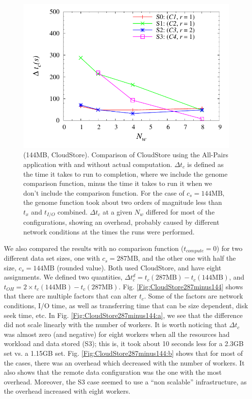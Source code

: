 \documentclass{rspublic}
\begin{document}
\begin{figure}
\begin{center}
\includegraphics[scale=0.5]{data/graphs/CloudStoreComputeMinusNoCompute144}
\caption{(144MB, CloudStore). Comparison of CloudStore using the All-Pairs application with
and without actual computation. $\Delta t_c$ is defined as the time it
takes to run to completion, where we include the genome comparison
function, minus the time it takes to run it when we don't include the
comparison function. For the case of $c_s=144\mbox{MB}$, the genome function
took about two orders of magnitude less than $t_x$ and $t_{I/O}$
combined. $\Delta t_c$ at a given $N_w$ differed for most of the
configurations, showing an overhead, probably caused by different
network conditions at the times the runs were performed.}
\label{Fig:experiment4}
\end{center}
\vspace{-0.5cm}
\end{figure}

We also compared the results with no comparison function
($t_{compute}=0$) for two different data set sizes, one with $c_s =
287\mbox{MB}$, and the other one with half the size, $c_s = 144\mbox{MB}$ (rounded
value). Both used CloudStore, and have eight assignments. We defined two
quantities, $\Delta t_c^d = t_c(287\mbox{MB}) - t_c(144\mbox{MB})$, and
$t_{OH} = 2 \times t_c(144\mbox{MB}) - t_c(287\mbox{MB})$. Fig.
\ref{Fig:CloudStore287minus144} shows that there are multiple factors
that can alter $t_c$. Some of the factors are network conditions, I/O
time, as well as transferring time that can be size dependent, disk seek
time, etc. In Fig. \ref{Fig:CloudStore287minus144:a}, we see that the
difference did not scale linearly with the number of workers. It is
worth noticing that $\Delta t_c$ was almost zero (and negative) for
eight workers when all the resources had workload and data stored (S3);
this is, it took about 10 seconds less for a 2.3GB set vs. a 1.15GB
set. Fig. \ref{Fig:CloudStore287minus144:b} shows that for most of the
cases, there was an overhead which decreased with the number of workers.
It also shows that the remote data configuration was the one with the
most overhead. Moreover, the S3 case seemed to use a ``non scalable''
infrastructure, as the overhead increased with eight workers.
\end{document}
